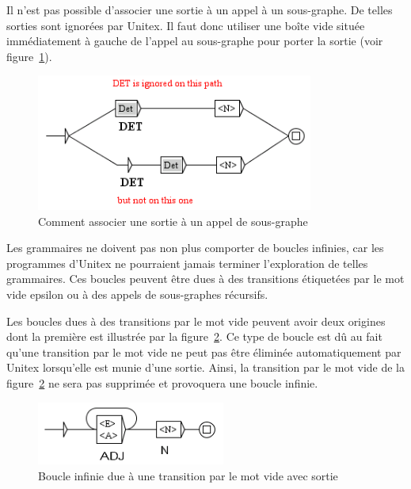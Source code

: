 \bigskip
\noindent Il n’est pas possible d’associer une sortie à un appel à un sous-graphe. De telles sorties
sont ignorées par Unitex. Il faut donc utiliser une boîte vide située immédiatement à gauche
de l’appel au sous-graphe pour porter la sortie (voir figure~\ref{fig-subgraph-output}).

\bigskip
\begin{figure}[!h]
\begin{center}
\includegraphics[width=9.1cm]{resources/img/fig6-7.png}
\caption{Comment associer une sortie à un appel de sous-graphe\label{fig-subgraph-output}}
\end{center}
\end{figure}

\noindent Les grammaires ne doivent pas non plus comporter de boucles infinies, car les programmes
d’Unitex ne pourraient jamais terminer l’exploration de telles grammaires.
Ces boucles peuvent être dues à des transitions étiquetées par le mot vide epsilon ou à des
appels de sous-graphes récursifs.


\bigskip
\noindent Les boucles dues à des transitions par le mot vide peuvent avoir deux origines dont la
première est illustrée par la figure~\ref{fig-epsilon-output-loop}.
Ce type de boucle est dû au fait qu’une transition par le mot vide ne peut pas être éliminée
automatiquement par Unitex lorsqu’elle est munie d’une sortie. Ainsi, la transition par
le mot vide de la figure~\ref{fig-epsilon-output-loop} ne sera pas supprimée et provoquera une
boucle infinie.

\bigskip
\begin{figure}[!h]
\begin{center}
\includegraphics[width=6.2cm]{resources/img/fig6-8.png}
\caption{Boucle infinie due à une transition par le mot vide avec sortie\label{fig-epsilon-output-loop}}
\end{center}
\end{figure}

